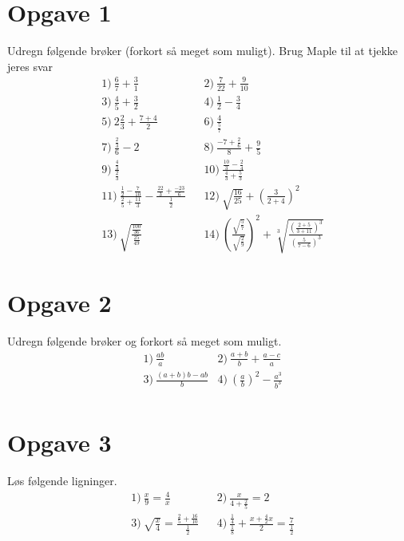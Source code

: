 \section*{Opgave 1}
Udregn følgende brøker (forkort så meget som muligt). Brug Maple til at tjekke jeres svar
\begin{align*}
	&1)\  \frac{6}{7} + \frac{3}{1}            &&2)\ \frac{7}{22} + \frac{9}{10}\\
 	&3)\ \frac{4}{5} + \frac{3}{2}      &&4)\ \frac{1}{2} - \frac{3}{4}\\
 	&5)\  2\frac{2}{3} + \frac{7+4}{2}              &&6)\ \frac{4}{\frac{5}{7}}\\
 	&7)\  \frac{\frac{2}{3}}{6} - 2           &&8)\ \frac{-7+\frac{2}{6}}{8} + \frac{9}{5}\\
	&9)\ \frac{\frac{4}{3}}{\frac{2}{3}} &&10)\ \frac{\frac{10}{3}-\frac{2}{4}}{\frac{4}{3}+\frac{5}{3}} \\
	&11)\  \frac{\frac{1}{2}-\frac{7}{10}}{\frac{2}{5}+\frac{11}{3}} -  \frac{\frac{22}{3}+ \frac{-23}{6}}{\frac{1}{2}}        &&12)\ \sqrt{\frac{16}{25}} + \left(\frac{3}{2+4}\right)^2\\
	&13)\ \sqrt{\frac{\frac{100}{36}}{\frac{25}{49}}} && 14) \   \left(\frac{\sqrt{\frac{5}{7}}}{\sqrt{\frac{2}{9}}}\right)^2 + \sqrt[3]{\frac{\left(\frac{2+5}{3+11}\right)^3}{\left( \frac{5}{7-6}\right)^3}}
\end{align*}

\section*{Opgave 2}
Udregn følgende brøker og forkort så meget som muligt. 
\begin{align*}
	&1) \ \frac{ab}{a}   &2) \  \frac{a+b}{b} + \frac{a-c}{a}    \\
	&3) \ \frac{(a+b)b-ab}{b}   &4) \  \left(\frac{a}{b}\right)^2 - \frac{a^3}{b^3}   \\
\end{align*}

\section*{Opgave 3}
Løs følgende ligninger.
\begin{align*}
	&1) \ \frac{x}{9} = \frac{4}{x}   &&2) \ \frac{x}{4+\frac{2}{5}} = 2     \\
	&3) \ \sqrt{\frac{x}{4}} = \frac{\frac{2}{5}+\frac{16}{10}}{\frac{1}{2}}    &&4) \ \frac{\frac{1}{4}}{\frac{1}{8}} + \frac{x+\frac{4}{2}x}{2} = \frac{7}{\frac{1}{2}}    \\
\end{align*}